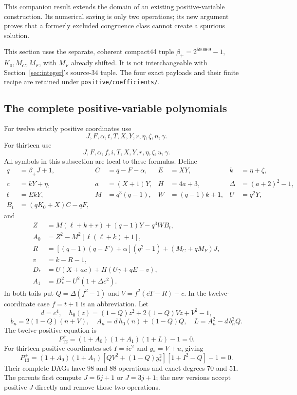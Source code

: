 This companion result extends the domain of an existing positive-variable
construction. Its numerical saving is only two operations; its new
argument proves that a formerly excluded congruence class cannot create
a spurious solution.

This section uses the separate, coherent compact44 tuple
$\beta_+=2^{590069}-1$, $K_0,M_C,M_F$, with $M_F$ already shifted.
It is not interchangeable with Section~\ref{sec:integer}'s source-34
tuple. The four exact payloads and their finite recipe are retained under
\texttt{positive/coefficients/}.

\subsection{The complete positive-variable polynomials}
For twelve strictly positive coordinates use
\[
 J,F,\alpha,t,T,X,Y,r,\eta,\zeta,n,\gamma.
\]
For thirteen use
\[
 J,F,\alpha,f,i,T,X,Y,r,\eta,\zeta,u,\gamma.
\]
All symbols in this subsection are local to these formulas. Define
\begin{align*}
 q&=\beta_+J+1,&C&=q-F-\alpha,&E&=XY,&k&=\eta+\zeta,\\
 c&=kY+\eta,&a&=(X+1)Y,&H&=4a+3,&\Delta&=(a+2)^2-1,\\
 \ell&=EkY,&M&=q^3(q-1),&W&=(q-1)k+1,&U&=q^2Y,\\
 B_t&=(qK_0+X)C-qF,&&&&&
\end{align*}
and
\begin{align*}
 Z&=M(\ell+k+r)+(q-1)Y-q^3WB_t,\\
 A_0&=Z^2-M^2[\ell(\ell+k)+1],\\
 R&=[(q-1)(q-F)+\alpha](q^2-1)+(M_C+qM_F)J,\\
 v&=k-R-1,\\
 D_*&=U(X+ac)+H(U\gamma+qE-v),\\
 A_1&=D_*^2-U^2(1+\Delta c^2).
\end{align*}
In both tails put $Q=\Delta(f^2-1)$ and $V=f^2(cT-R)-c$.
In the twelve-coordinate case $f=t+1$ is an abbreviation. Let
\[
 d=c^4,\quad h_0(z)=(1-Q)z^2+2(1-Q)Vz+V^2-1,
\]
\[
 b_n=2(1-Q)(n+V),\quad A_n=d\,h_0(n)+(1-Q)Q,\quad
 L=A_n^2-d\,b_n^2Q.
\]
The twelve-positive equation is
\[
 P_{12}^+=(1+A_0)(1+A_1)(1+L)-1=0.
\]
For thirteen positive coordinates set $I=ic^2$ and $y_*=V+u$, giving
\[
 P_{13}^+=(1+A_0)(1+A_1)
       [QV^2+(1-Q)y_*^2][1+I^2-Q]-1=0.
\]
Their complete DAGs have 98 and 88 operations and exact degrees 70 and 51.
The parents first compute $J=6j+1$ or $J=3j+1$; the new versions accept
positive $J$ directly and remove those two operations.

